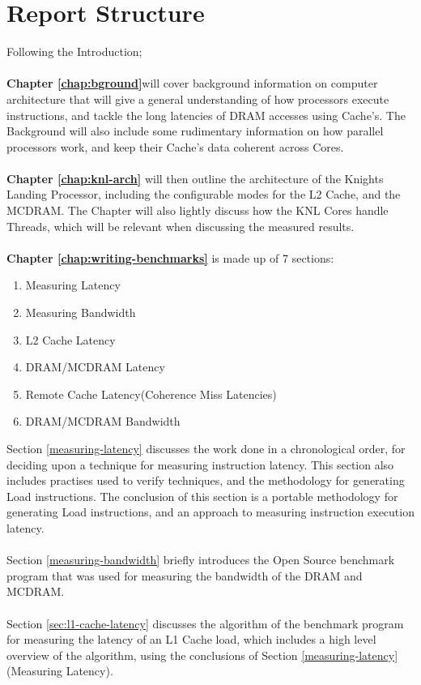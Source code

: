 \documentclass[bsc,frontabs,twoside,singlespacing,parskip,deptreport]{infthesis}     %
\begin{document}
\section{Report Structure}
Following the Introduction; \\
\\
\textbf{Chapter \ref{chap:bground}}will cover background information on computer architecture that will give a general understanding of how processors execute instructions, and tackle the long latencies of DRAM accesses using Cache's. The Background will also include some rudimentary information on how parallel processors work, and keep their Cache's data coherent across Cores. \\
\\
\textbf{Chapter \ref{chap:knl-arch}} will then outline the architecture of the Knights Landing Processor, including the configurable modes for the L2 Cache, and the MCDRAM. The Chapter will also lightly discuss how the KNL Cores handle Threads, which will be relevant when discussing the measured results. \\
\\
\textbf{Chapter \ref{chap:writing-benchmarks}} is made up of 7 sections:
\begin{enumerate}
    \item Measuring Latency
    \item Measuring Bandwidth
    \item L2 Cache Latency
    \item DRAM/MCDRAM Latency
    \item Remote Cache Latency(Coherence Miss Latencies)
    \item DRAM/MCDRAM Bandwidth
\end{enumerate}
Section \ref{measuring-latency} discusses the work done in a chronological order, for deciding upon a technique for measuring instruction latency. This section also includes practises used to verify techniques, and the methodology for generating Load instructions. The conclusion of this section is a portable methodology for generating Load instructions, and an approach to measuring instruction execution latency. \\
\\
Section \ref{measuring-bandwidth} briefly introduces the Open Source benchmark program that was used for measuring the bandwidth of the DRAM and MCDRAM. \\
\\
Section \ref{sec:l1-cache-latency} discusses the algorithm of the benchmark program for measuring the latency of an L1 Cache load, which includes a high level overview of the algorithm, using the conclusions of Section \ref{measuring-latency}(Measuring Latency). \\
\end{document}
